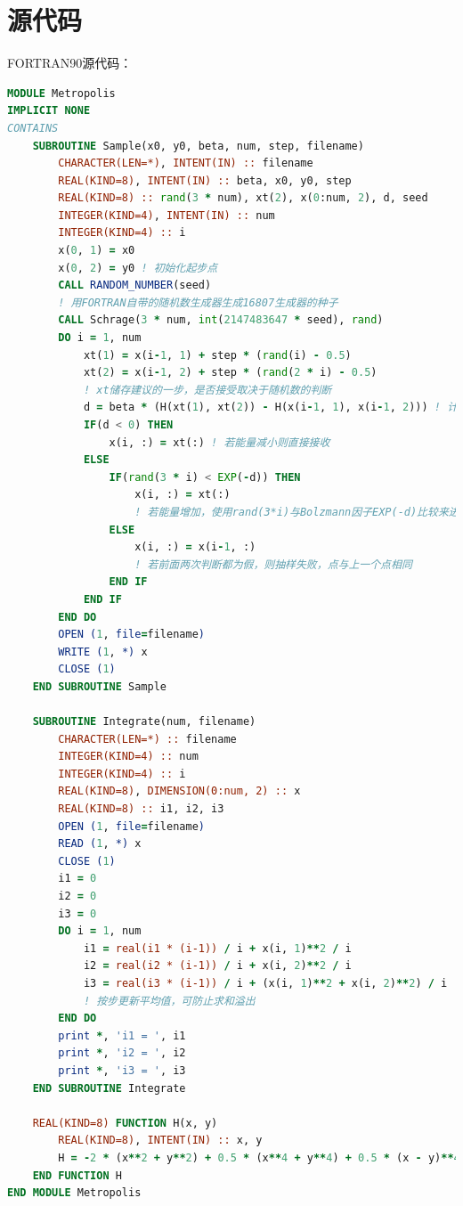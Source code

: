 \documentclass[12pt,a4paper,utf8]{ctexart}
\begin{document}
\section{源代码}
FORTRAN90源代码：
\begin{framed}
\begin{lstlisting}[language=Fortran]
MODULE Metropolis
IMPLICIT NONE
CONTAINS
    SUBROUTINE Sample(x0, y0, beta, num, step, filename)
        CHARACTER(LEN=*), INTENT(IN) :: filename
        REAL(KIND=8), INTENT(IN) :: beta, x0, y0, step
        REAL(KIND=8) :: rand(3 * num), xt(2), x(0:num, 2), d, seed
        INTEGER(KIND=4), INTENT(IN) :: num
        INTEGER(KIND=4) :: i
        x(0, 1) = x0
        x(0, 2) = y0 ! 初始化起步点
        CALL RANDOM_NUMBER(seed)
        ! 用FORTRAN自带的随机数生成器生成16807生成器的种子
        CALL Schrage(3 * num, int(2147483647 * seed), rand)
        DO i = 1, num
            xt(1) = x(i-1, 1) + step * (rand(i) - 0.5)
            xt(2) = x(i-1, 2) + step * (rand(2 * i) - 0.5) 
            ! xt储存建议的一步，是否接受取决于随机数的判断
            d = beta * (H(xt(1), xt(2)) - H(x(i-1, 1), x(i-1, 2))) ! 计算能量差d
            IF(d < 0) THEN
                x(i, :) = xt(:) ! 若能量减小则直接接收
            ELSE
                IF(rand(3 * i) < EXP(-d)) THEN
                    x(i, :) = xt(:) 
                    ! 若能量增加，使用rand(3*i)与Bolzmann因子EXP(-d)比较来进行判断
                ELSE
                    x(i, :) = x(i-1, :) 
                    ! 若前面两次判断都为假，则抽样失败，点与上一个点相同
                END IF
            END IF
        END DO
        OPEN (1, file=filename)
        WRITE (1, *) x
        CLOSE (1)
    END SUBROUTINE Sample
    
    SUBROUTINE Integrate(num, filename)
        CHARACTER(LEN=*) :: filename
        INTEGER(KIND=4) :: num
        INTEGER(KIND=4) :: i
        REAL(KIND=8), DIMENSION(0:num, 2) :: x
        REAL(KIND=8) :: i1, i2, i3
        OPEN (1, file=filename)
        READ (1, *) x
        CLOSE (1)
        i1 = 0
        i2 = 0
        i3 = 0
        DO i = 1, num
            i1 = real(i1 * (i-1)) / i + x(i, 1)**2 / i
            i2 = real(i2 * (i-1)) / i + x(i, 2)**2 / i
            i3 = real(i3 * (i-1)) / i + (x(i, 1)**2 + x(i, 2)**2) / i
            ! 按步更新平均值，可防止求和溢出
        END DO
        print *, 'i1 = ', i1
        print *, 'i2 = ', i2
        print *, 'i3 = ', i3
    END SUBROUTINE Integrate
    
    REAL(KIND=8) FUNCTION H(x, y)
        REAL(KIND=8), INTENT(IN) :: x, y
        H = -2 * (x**2 + y**2) + 0.5 * (x**4 + y**4) + 0.5 * (x - y)**4
    END FUNCTION H
END MODULE Metropolis   


\end{lstlisting}
\end{framed}
\end{document}
